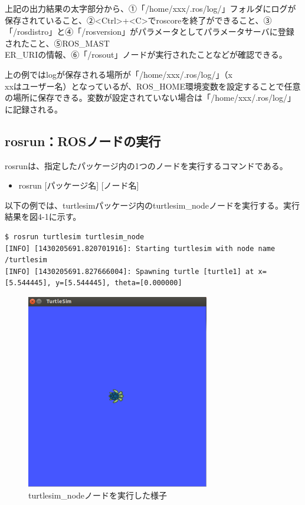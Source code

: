 上記の出力結果の太字部分から、①「/home/xxx/.ros/log/」フォルダにログが保存されていること、②<Ctrl>+<C>でroscoreを終了ができること、③「/rosdistro」と④「/rosversion」がパラメータとしてパラメータサーバに登録されたこと、⑤ROS\_MAST\\ER\_URIの情報、⑥「/rosout」ノードが実行されたことなどが確認できる。

\begin{exercise}[ログの保存場所]
上の例ではlogが保存される場所が「/home/xxx/.ros/log/」（x\\xxはユーザー名）となっているが、ROS\_HOME環境変数を設定することで任意の場所に保存できる。変数が設定されていない場合は「/home/xxx/.ros/log/」に記録される。
\end{exercise}

\subsection{rosrun：ROSノードの実行}

rosrunは、指定したパッケージ内の1つのノードを実行するコマンドである。\\

\begin{itemize}
\item   rosrun [パッケージ名] [ノード名]\\
\end{itemize}

以下の例では、turtlesimパッケージ内のturtlesim\_nodeノードを実行する。実行結果を図4-1に示す。

\begin{lstlisting}[language=ROS]
$ rosrun turtlesim turtlesim_node
[INFO] [1430205691.820701916]: Starting turtlesim with node name /turtlesim
[INFO] [1430205691.827666004]: Spawning turtle [turtle1] at x=[5.544445], y=[5.544445], theta=[0.000000]
\end{lstlisting}

\begin{figure}[h]
  \centering
  \includegraphics[width=8cm]{pictures/chapter4/pic_04_01.png}
  \caption{turtlesim\_nodeノードを実行した様子}
\end{figure}



